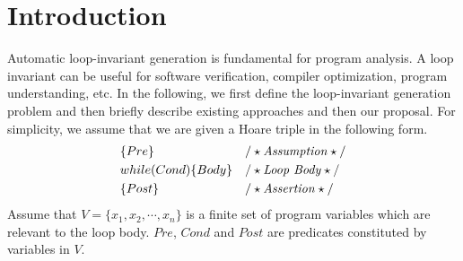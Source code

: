 
\section{Introduction} %
\label{sec:introduction}

Automatic loop-invariant generation is fundamental for program analysis. A loop invariant can be useful for software verification, compiler optimization, program understanding, etc. In the following, we first define the loop-invariant generation problem and then briefly describe existing approaches and then our proposal. For simplicity, we assume that we are given a Hoare triple in the following form.
\begin{align*}
&\{Pre\} & & /\star\text{\emph{Assumption}}\star/ \\
& while (Cond) \{ Body \} && /\star\text{\emph{Loop Body}}\star/\\
&\{ Post \} & & /\star\text{\emph{Assertion}}\star/
\end{align*}
Assume that $V = \{x_1{,} x_2{,} \cdots{,} x_n\}$ is a finite set of program variables which are relevant to the loop body. $Pre$, $Cond$ and $Post$ are predicates constituted by variables in $V$.


